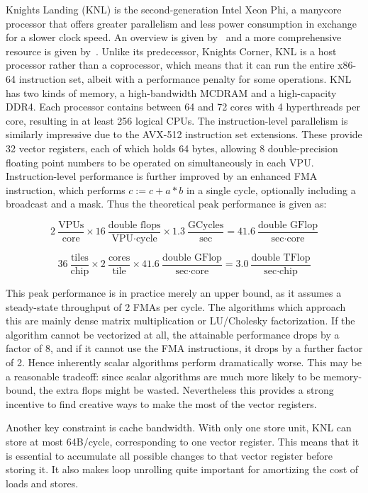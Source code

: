 Knights Landing (KNL) is the second-generation Intel Xeon Phi, a manycore processor that offers greater parallelism and less power consumption in exchange for a slower clock speed. An overview is given by~\cite{Sodani:2016:KLS:2927511.2927563} and a more comprehensive resource is given by~\cite{Jeffers:2016:IXP:3050856}. Unlike its predecessor, Knights Corner, KNL is a host processor rather than a coprocessor, which means that it can run the entire x86-64 instruction set, albeit with a performance penalty for some operations. KNL has two kinds of memory, a high-bandwidth MCDRAM and a high-capacity DDR4. Each processor contains between 64 and 72 cores with 4 hyperthreads per core, resulting in at least 256 logical CPUs. The instruction-level parallelism is similarly impressive due to the AVX-512 instruction set extensions. These provide 32 vector registers, each of which holds 64 bytes, allowing 8 double-precision floating point numbers to be operated on simultaneously in each \gls{VPU}. Instruction-level performance is further improved by an enhanced \gls{FMA} instruction, which performs $c := c + a*b$ in a single cycle, optionally including a broadcast and a mask. Thus the theoretical peak performance is given as:

\[
2~\frac{\text{VPUs}}{\text{core}} \times 16~\frac{\text{double flops}}{\text{VPU} \cdot \text{cycle}} \times 1.3~\frac{\text{GCycles}}{\text{sec}} = 41.6~\frac{\text{double GFlop}}{\text{sec}\cdot \text{core}}
  \label{eq:knl_peak_perf}
\]

\[
36~\frac{\text{tiles}}{\text{chip}} \times 2~\frac{\text{cores}}{\text{tile}} \times 41.6~\frac{\text{double~GFlop}}{\text{sec}\cdot \text{core}} = 3.0~\frac{\text{double TFlop}}{\text{sec}\cdot \text{chip}}
\]

This peak performance is in practice merely an upper bound, as it assumes a steady-state throughput of 2 FMAs per cycle. The algorithms which approach this are mainly dense matrix multiplication or LU/Cholesky factorization. If the algorithm cannot be vectorized at all, the attainable performance drops by a factor of 8, and if it cannot use the FMA instructions, it drops by a further factor of 2. Hence inherently scalar algorithms perform dramatically worse. This may be a reasonable tradeoff: since scalar algorithms are much more likely to be memory-bound, the extra flops might be wasted. Nevertheless this provides a strong incentive to find creative ways to make the most of the vector registers. 

Another key constraint is cache bandwidth. With only one store unit, KNL can store at most 64B/cycle, corresponding to one vector register. This means that it is essential to accumulate all possible changes to that vector register before storing it. It also makes loop unrolling quite important for amortizing the cost of loads and stores.

